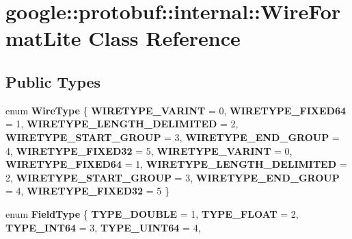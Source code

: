 \hypertarget{classgoogle_1_1protobuf_1_1internal_1_1WireFormatLite}{}\section{google\+:\+:protobuf\+:\+:internal\+:\+:Wire\+Format\+Lite Class Reference}
\label{classgoogle_1_1protobuf_1_1internal_1_1WireFormatLite}
\subsection*{Public Types}
\begin{DoxyCompactItemize}
\item 
\mbox{\label{classgoogle_1_1protobuf_1_1internal_1_1WireFormatLite_a07e74817dc05ab0327283186fb9d96f9}} 
enum {\bfseries Wire\+Type} \{ \newline
{\bfseries W\+I\+R\+E\+T\+Y\+P\+E\+\_\+\+V\+A\+R\+I\+NT} = 0, 
{\bfseries W\+I\+R\+E\+T\+Y\+P\+E\+\_\+\+F\+I\+X\+E\+D64} = 1, 
{\bfseries W\+I\+R\+E\+T\+Y\+P\+E\+\_\+\+L\+E\+N\+G\+T\+H\+\_\+\+D\+E\+L\+I\+M\+I\+T\+ED} = 2, 
{\bfseries W\+I\+R\+E\+T\+Y\+P\+E\+\_\+\+S\+T\+A\+R\+T\+\_\+\+G\+R\+O\+UP} = 3, 
\newline
{\bfseries W\+I\+R\+E\+T\+Y\+P\+E\+\_\+\+E\+N\+D\+\_\+\+G\+R\+O\+UP} = 4, 
{\bfseries W\+I\+R\+E\+T\+Y\+P\+E\+\_\+\+F\+I\+X\+E\+D32} = 5, 
{\bfseries W\+I\+R\+E\+T\+Y\+P\+E\+\_\+\+V\+A\+R\+I\+NT} = 0, 
{\bfseries W\+I\+R\+E\+T\+Y\+P\+E\+\_\+\+F\+I\+X\+E\+D64} = 1, 
\newline
{\bfseries W\+I\+R\+E\+T\+Y\+P\+E\+\_\+\+L\+E\+N\+G\+T\+H\+\_\+\+D\+E\+L\+I\+M\+I\+T\+ED} = 2, 
{\bfseries W\+I\+R\+E\+T\+Y\+P\+E\+\_\+\+S\+T\+A\+R\+T\+\_\+\+G\+R\+O\+UP} = 3, 
{\bfseries W\+I\+R\+E\+T\+Y\+P\+E\+\_\+\+E\+N\+D\+\_\+\+G\+R\+O\+UP} = 4, 
{\bfseries W\+I\+R\+E\+T\+Y\+P\+E\+\_\+\+F\+I\+X\+E\+D32} = 5
 \}
\item 
\mbox{\label{classgoogle_1_1protobuf_1_1internal_1_1WireFormatLite_aaffa24b0edf986fa1541988d845e92ca}} 
enum {\bfseries Field\+Type} \{ \newline
{\bfseries T\+Y\+P\+E\+\_\+\+D\+O\+U\+B\+LE} = 1, 
{\bfseries T\+Y\+P\+E\+\_\+\+F\+L\+O\+AT} = 2, 
{\bfseries T\+Y\+P\+E\+\_\+\+I\+N\+T64} = 3, 
{\bfseries T\+Y\+P\+E\+\_\+\+U\+I\+N\+T64} = 4, 
\newline

\end{DoxyCompactItemize}
